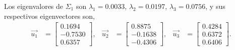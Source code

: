 Los eigenvalores de $\Sigma_1$ son $\lambda_1 = 0.0033$, $\lambda_2 = 0.0197$, $\lambda_3 = 0.0756$, y sus respectivos eigenvectores son,
\begin{align*}
    \vec{u_1} & =
    \begin{bmatrix}
        0.1694 \\
        -0.7530 \\
        0.6357
    \end{bmatrix}, &
    \vec{u_2} & = 
    \begin{bmatrix}
        0.8875 \\
        -0.1638 \\
        -0.4306
    \end{bmatrix}, &
    \vec{u_3} & =
    \begin{bmatrix}
        0.4284 \\
        0.6372 \\
        0.6406
    \end{bmatrix}.
\end{align*}

